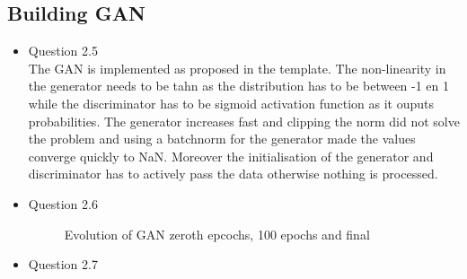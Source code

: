 \documentclass{article}
\begin{document}
    \subsection{Building GAN}
      \begin{itemize}
        \item Question 2.5 \\
        The GAN is implemented as proposed in the template. The non-linearity in the generator needs to be tahn as the distribution has to be between -1 en 1 while the discriminator has to be sigmoid activation function as it ouputs probabilities. The generator increases fast and clipping the norm did not solve the problem and using a batchnorm for the generator made the values converge quickly to NaN. Moreover the initialisation of the generator and discriminator has to actively pass the data otherwise nothing is processed. 
        \item Question 2.6  \\
        \begin{figure}[htbp]
          \centering
          \caption{Evolution of GAN zeroth epcochs, 100 epochs and final}
          \label{<label>}
        \end{figure}
        \item Question 2.7
      \end{itemize}
\end{document}

